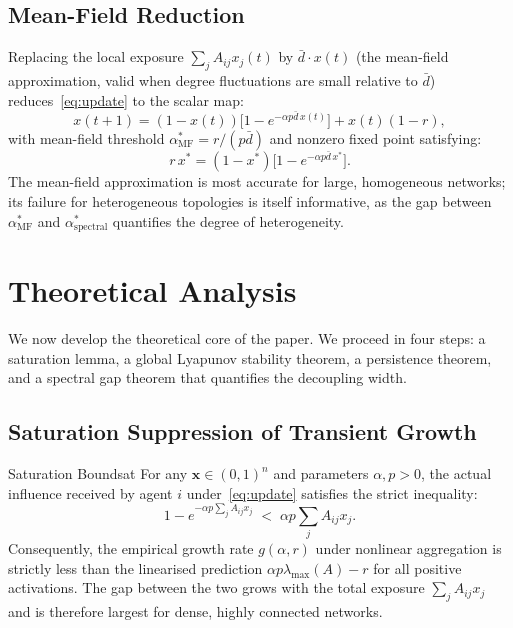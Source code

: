 \documentclass[10pt,twocolumn]{article}
\theoremstyle{myproof}
\newcommand{\lmax}{\lambda_{\max}}
\newcommand{\xst}{x^*}
\begin{document}
\subsection{Mean-Field Reduction}
Replacing the local exposure $\sum_j A_{ij}x_j(t)$ by $\bar{d}\cdot x(t)$ (the mean-field
approximation, valid when degree fluctuations are small relative to $\bar{d}$) reduces~\eqref{eq:update}
to the scalar map:
\begin{equation}
\label{eq:mf}
  x(t{+}1)=(1-x(t))\bigl[1-e^{-\alpha p\bar{d}\,x(t)}\bigr]+x(t)(1-r),
\end{equation}
with mean-field threshold $\alpha^*_{\mathrm{MF}}=r/(p\bar{d})$ and nonzero fixed point satisfying:
\begin{equation}
\label{eq:fp}
  r\,\xst=(1-\xst)\bigl[1-e^{-\alpha p\bar{d}\,\xst}\bigr].
\end{equation}
The mean-field approximation is most accurate for large, homogeneous networks; its failure for
heterogeneous topologies is itself informative, as the gap between $\alpha^*_{\mathrm{MF}}$ and
$\alpha^*_{\mathrm{spectral}}$ quantifies the degree of heterogeneity.

\section{Theoretical Analysis}
\label{sec:theory}

We now develop the theoretical core of the paper. We proceed in four steps: a saturation lemma,
a global Lyapunov stability theorem, a persistence theorem, and a spectral gap theorem that
quantifies the decoupling width.

\subsection{Saturation Suppression of Transient Growth}

\begin{lemma}{Saturation Bound}{sat}
For any $\mathbf{x}\in(0,1)^n$ and parameters $\alpha,p>0$, the actual influence received by
agent $i$ under~\eqref{eq:update} satisfies the strict inequality:
\begin{equation}
\label{eq:satbound}
  1-e^{-\alpha p\sum_j A_{ij}x_j} \;<\; \alpha p\sum_j A_{ij}x_j.
\end{equation}
Consequently, the empirical growth rate $g(\alpha,r)$ under nonlinear aggregation is strictly less
than the linearised prediction $\alpha p\lmax(A)-r$ for all positive activations. The gap between
the two grows with the total exposure $\sum_j A_{ij}x_j$ and is therefore largest for dense,
highly connected networks.
\end{lemma}
\end{document}
